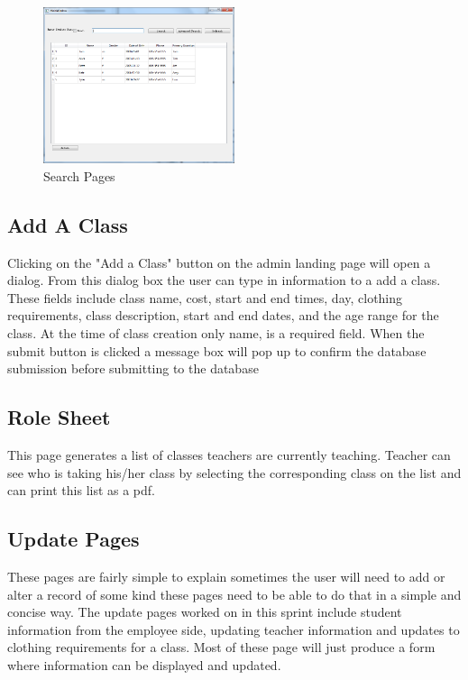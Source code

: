 \begin{figure}
\caption{Search Pages}
\centering
\includegraphics[width=0.5\textwidth]{search.png}
\end{figure}

\subsection{Add A Class}
Clicking on the "Add a Class" button on the admin landing page will open a dialog. From this dialog box the user can type in information to a add a class. These fields include class name, cost, start and end times, day, clothing requirements, class description, start and end dates, and the age range for the class.  At the time of class creation only name, is a required field. When the submit button is clicked a message box will pop up to confirm the database submission before submitting to the database  

\subsection{Role Sheet}
This page generates a list of classes teachers are currently teaching. Teacher can see who is taking his/her class by selecting the corresponding class on the list and can print this list as a pdf. 

\subsection{Update Pages}
These pages are fairly simple to explain sometimes the user will need to add or alter a record of some kind these pages need to be able to do that in a simple and concise way. The update pages worked on in this sprint include student information from the employee side, updating teacher information and updates to clothing requirements for a class. Most of these page will just produce a form where information can be displayed and updated.

